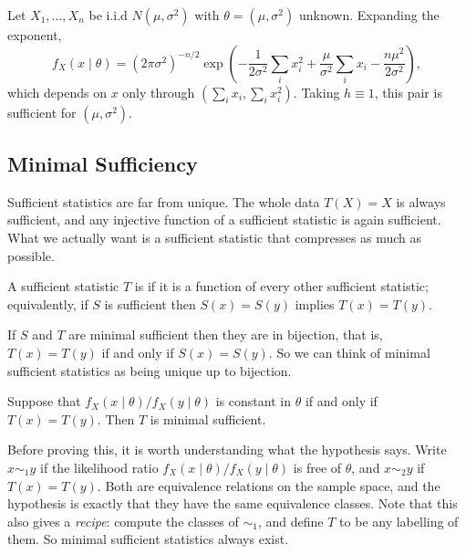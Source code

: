 \documentclass[a4paper]{scrartcl}
\begin{document}
\begin{example}
  Let $X_1, \dots, X_n$ be i.i.d $N(\mu, \sigma^2)$ with $\theta = (\mu, \sigma^2)$ unknown. Expanding the exponent,
  $$
  f_X(x \mid \theta) = (2\pi\sigma^2)^{-n/2}\exp\left(-\frac{1}{2\sigma^2}\sum_i x_i^2 + \frac{\mu}{\sigma^2}\sum_i x_i - \frac{n\mu^2}{2\sigma^2}\right),
  $$
  which depends on $x$ only through $\left(\sum_i x_i, \sum_i x_i^2\right)$. Taking $h \equiv 1$, this pair is sufficient for $(\mu,\sigma^2)$.
\end{example}

\subsection{Minimal Sufficiency}

Sufficient statistics are far from unique. The whole data $T(X) = X$ is always sufficient, and any injective function of a sufficient statistic is again sufficient. What we actually want is a sufficient statistic that compresses as much as possible.

\begin{definition}
  A sufficient statistic $T$ is  if it is a function of every other sufficient statistic; equivalently, if $S$ is sufficient then $S(x) = S(y)$ implies $T(x) = T(y)$.
\end{definition}

\begin{remark}
  If $S$ and $T$ are minimal sufficient then they are in bijection, that is, $T(x) = T(y)$ if and only if $S(x) = S(y)$.
  So we can think of minimal sufficient statistics as being unique up to bijection.
\end{remark}

\begin{theorem}
  Suppose that $f_X(x \mid \theta ) / f_X(y \mid \theta)$ is constant in $\theta$ if and only if $T(x) = T(y)$. Then $T$ is minimal sufficient.
\end{theorem}

Before proving this, it is worth understanding what the hypothesis says. Write $x \sim_1 y$ if the likelihood ratio $f_X(x\mid\theta)/f_X(y\mid\theta)$ is free of $\theta$, and $x \sim_2 y$ if $T(x) = T(y)$. Both are equivalence relations on the sample space, and the hypothesis is exactly that they have the same equivalence classes. Note that this also gives a \emph{recipe}: compute the classes of $\sim_1$, and define $T$ to be any labelling of them. So minimal sufficient statistics always exist.
\end{document}
